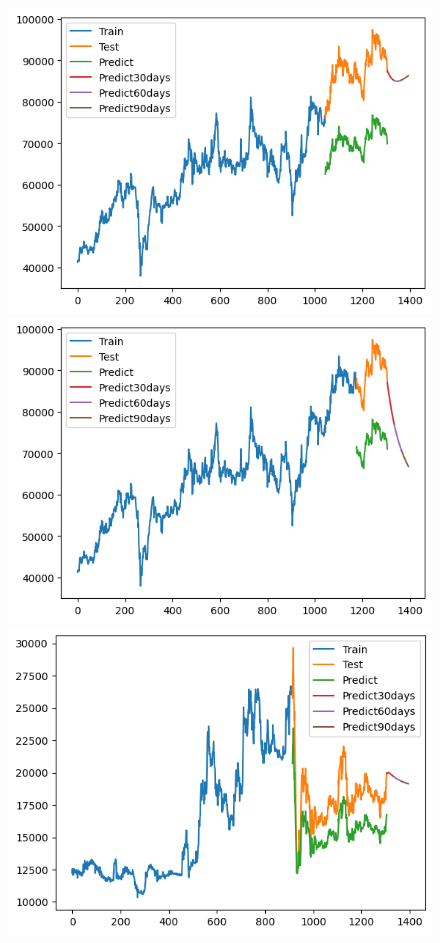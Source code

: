 \begin{figure}[H]
\begin{minipage}{0.15\textwidth}
    \includegraphics[width=1\textwidth]{resources/chapter-5/newdata1/result/VCB_GRU_8_2.png}
    \end{minipage}
    \hfill
        \begin{minipage}{0.15\textwidth}
    \centering
    \includegraphics[width=1\textwidth]{resources/chapter-5/newdata1/result/VCB_GRU_9_1.png}
    \end{minipage}
    \hfill
    \begin{minipage}{0.15\textwidth}
    \centering
    \includegraphics[width=1\textwidth]{resources/chapter-5/newdata1/result/EXIM_GRU_7_3.png}

\end{minipage}
\end{figure}
